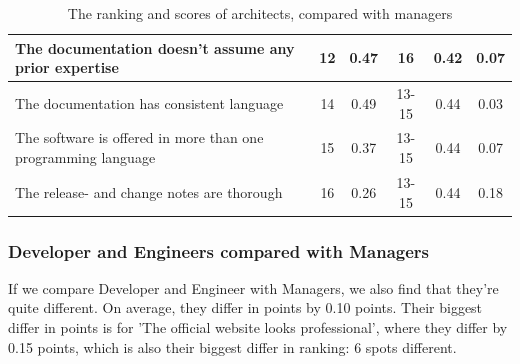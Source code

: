 \documentclass{article}
\begin{document}
\begin{table}[H]
\begin{tabularx}{\columnwidth}{X|c:c|c:c|c}
The documentation doesn't assume any prior expertise                  &        12 & 0.47       &           16 & 0.42           & 0.07  \\ \hline
The documentation has consistent language                             &        14 & 0.49       &        13-15 & 0.44           & 0.03  \\ \hline
The software is offered in more than one programming language         &        15 & 0.37       &        13-15 & 0.44           & 0.07  \\ \hline
The release- and change notes are thorough                            &        16 & 0.26       &        13-15 & 0.44           & 0.18  \\ \hline
\end{tabularx}
\caption{The ranking and scores of architects, compared with managers}
\label{tab:arch-devs}
\end{table}

\subsubsection{Developer and Engineers compared with Managers}
If we compare Developer and Engineer with Managers, we also find that
they're quite different. On average, they differ in points by 0.10
points. Their biggest differ in points is for 'The official website
looks professional', where they differ by 0.15 points, which is also
their biggest differ in ranking: 6 spots different.
\end{document}
